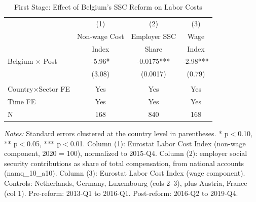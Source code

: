 \begin{table}[H]
\centering
\caption{First Stage: Effect of Belgium's SSC Reform on Labor Costs}
\begin{threeparttable}
\begin{tabular}{lccc}
\toprule
 & (1) & (2) & (3) \\
 & Non-wage Cost & Employer SSC & Wage \\
 & Index & Share & Index \\
\midrule
Belgium $\times$ Post & -5.96* & -0.0175*** & -2.98*** \\
 & (3.08) & (0.0017) & (0.79) \\
\\
Country$\times$Sector FE & Yes & Yes & Yes \\
Time FE & Yes & Yes & Yes \\
N & 168 & 840 & 168 \\
\bottomrule
\end{tabular}
\begin{tablenotes}[flushleft]
\small
\item \textit{Notes:} Standard errors clustered at the country level in parentheses. * p$<$0.10, ** p$<$0.05, *** p$<$0.01. Column (1): Eurostat Labor Cost Index (non-wage component, 2020 = 100), normalized to 2015-Q4. Column (2): employer social security contributions as share of total compensation, from national accounts (namq\_10\_a10). Column (3): Eurostat Labor Cost Index (wage component). Controls: Netherlands, Germany, Luxembourg (cols 2--3), plus Austria, France (col 1). Pre-reform: 2013-Q1 to 2016-Q1. Post-reform: 2016-Q2 to 2019-Q4.
\end{tablenotes}
\end{threeparttable}
\label{tab:first_stage}
\end{table}
